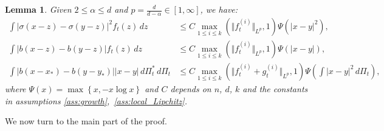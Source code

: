 \documentclass[10pt,oneside]{amsart}
\numberwithin{equation}{section}
\numberwithin{definition}{section}
\numberwithin{theorem}{section}
\newtheorem{lemma}{Lemma}
\numberwithin{lemma}{section}
\begin{document}
\begin{lemma}\label{lem:A_b_estimates}
  Given $2\leq \alpha \leq d$ and $p=\frac{d}{d-\alpha}\in [1,\infty]$, we have:
  \begin{align}
    \int\left|\sigma(x-z)-\sigma(y-z)\right|^{2}f_t(z)\,dz &
    \leq C\max_{1\leq i \leq k}(\Vert f_{t}^{(i)}\Vert _{L^{p}},1)\Psi(|x-y|^{2}),
    \label{eq:A_estimate}\\
    \int\left|b(x-z)-b(y-z)\right|f_{t}(z)\,dz & 
    \leq C\max_{1\leq i \leq k}(\Vert f_{t}^{(i)}\Vert _{L^{p}},1)\Psi(|x-y|),
    \label{eq:b_estimate}\\
    \int\left|b(x-x_{*})-b(y-y_{*})\right||x-y|\,d\Pi_{t}^{*}\,d\Pi_{t} &
    \leq C\max_{1\leq i \leq k}( \Vert f_{t}^{(i)}+g_{t}^{(i)}\Vert _{L^{p}},1)
    \Psi\left(\int|x-y|^{2}\,d\Pi_{t}\right)
    \label{eq:b_estimate2},
  \end{align}
  where $\Psi(x)=\max\left\{ x,-x\log x\right\}$ and $C$ depends on $n$, $d$, $k$ and the constants in assumptions \ref{ass:growth},~\ref{ass:local_Lipchitz}.
\end{lemma}

We now turn to the main part of the proof.
\end{document}
